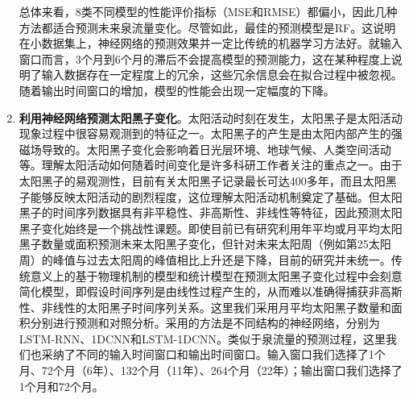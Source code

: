 \begin{enumerate}
    总体来看，8类不同模型的性能评价指标（MSE和RMSE）都偏小，因此几种方法都适合预测未来泉流量变化。尽管如此，最佳的预测模型是RF。这说明在小数据集上，神经网络的预测效果并一定比传统的机器学习方法好。就输入窗口而言，3个月到6个月的滞后不会提高模型的预测能力，这在某种程度上说明了输入数据存在一定程度上的冗余，这些冗余信息会在拟合过程中被忽视。随着输出时间窗口的增加，模型的性能会出现一定幅度的下降。
  
  
    \item \textbf{利用神经网络预测太阳黑子变化}。太阳活动时刻在发生，太阳黑子是太阳活动现象过程中很容易观测到的特征之一。太阳黑子的产生是由太阳内部产生的强磁场导致的。太阳黑子变化会影响着日光层环境、地球气候、人类空间活动等。理解太阳活动如何随着时间变化是许多科研工作者关注的重点之一。由于太阳黑子的易观测性，目前有关太阳黑子记录最长可达400多年，而且太阳黑子能够反映太阳活动的剧烈程度，这位理解太阳活动机制奠定了基础。但太阳黑子的时间序列数据具有非平稳性、非高斯性、非线性等特征，因此预测太阳黑子变化始终是一个挑战性课题。即使目前已有研究利用年平均或月平均太阳黑子数量或面积预测未来太阳黑子变化，但针对未来太阳周（例如第25太阳周）的峰值与过去太阳周的峰值相比上升还是下降，目前的研究并未统一。传统意义上的基于物理机制的模型和统计模型在预测太阳黑子变化过程中会刻意简化模型，即假设时间序列是由线性过程产生的，从而难以准确得捕获非高斯性、非线性的太阳黑子时间序列关系。这里我们采用月平均太阳黑子数量和面积分别进行预测和对照分析。采用的方法是不同结构的神经网络，分别为LSTM-RNN、1DCNN和LSTM-1DCNN。类似于泉流量的预测过程，这里我们也采纳了不同的输入时间窗口和输出时间窗口。输入窗口我们选择了1个月、72个月（6年）、132个月（11年）、264个月（22年）；输出窗口我们选择了1个月和72个月。
    

\end{enumerate}
